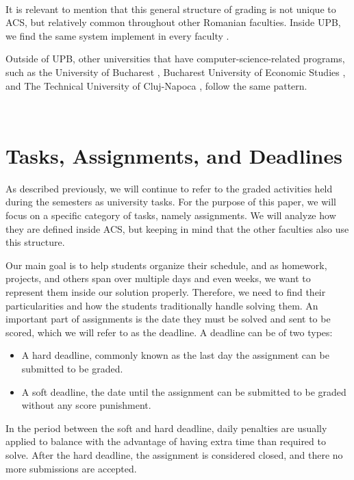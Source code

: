 ~

It is relevant to mention that this general structure of grading is not unique to ACS, but relatively common throughout other Romanian faculties. Inside UPB, we find the same system implement in every faculty \cite{upb2013regulament}.

Outside of UPB, other universities that have computer-science-related programs, such as the University of Bucharest \cite{unibuc2019regulament}, Bucharest University of Economic Studies \cite{ase2020regulament}, and The Technical University of Cluj-Napoca \cite{utcn2020regulament}, follow the same pattern.


~

\section{Tasks, Assignments, and Deadlines} \label{2:assignments}
As described previously, we will continue to refer to the graded activities held during the semesters as university tasks. 
For the purpose of this paper, we will focus on a specific category of tasks, namely assignments. We will analyze how they are defined inside ACS, but keeping in mind that the other faculties also use this structure. 

Our main goal is to help students organize their schedule, and as homework, projects, and others span over multiple days and even weeks, we want to represent them inside our solution properly. Therefore, we need to find their particularities and how the students traditionally handle solving them.
An important part of assignments is the date they must be solved and sent to be scored, which we will refer to as the deadline. A deadline can be of two types:  
\begin{itemize}
            \setlength{\topsep}{0.5pt}
            \setlength{\itemsep}{0.5pt}
            \setlength{\parsep}{0.5pt}
            \item A hard deadline, commonly known as the last day the assignment can be submitted to be graded. 
            \item A soft deadline, the date until the assignment can be submitted to be graded without any score punishment. 

\end{itemize}
In the period between the soft and hard deadline, daily penalties are usually applied to balance with the advantage of having extra time than required to solve. After the hard deadline, the assignment is considered closed, and there no more submissions are accepted.

